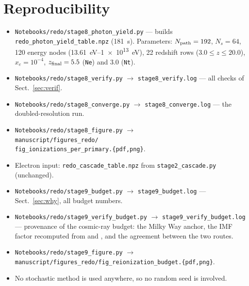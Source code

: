 \documentclass[11pt,a4paper]{article}
\begin{document}
\section*{Reproducibility}
\begin{itemize}\itemsep1pt
\item \texttt{Notebooks/redo/stage8\_photon\_yield.py} --- builds\\
      \texttt{redo\_photon\_yield\_table.npz} (\SI{181}{\second}).
      Parameters: $N_{\rm path}=192$, $N_s=64$, 120 energy nodes
      (\SIrange{13.61}{1e13}{\electronvolt}), 22 redshift rows
      ($3.0\le z\le20.0$), $x_e=10^{-4}$, $z_{\rm final}=5.5$
      (\texttt{Ne}) and $3.0$ (\texttt{Nt}).
\item \texttt{Notebooks/redo/stage8\_verify.py} $\to$
      \texttt{stage8\_verify.log} --- all checks of Sect.~\ref{sec:verif}.
\item \texttt{Notebooks/redo/stage8\_converge.py} $\to$
      \texttt{stage8\_converge.log} --- the doubled-resolution run.
\item \texttt{Notebooks/redo/stage8\_figure.py} $\to$\\
      \texttt{manuscript/figures\_redo/}\\
      \texttt{fig\_ionizations\_per\_primary.\{pdf,png\}}.
\item Electron input: \texttt{redo\_cascade\_table.npz} from
      \texttt{stage2\_cascade.py} (unchanged).
\item \texttt{Notebooks/redo/stage9\_budget.py} $\to$
      \texttt{stage9\_budget.log} --- Sect.~\ref{sec:why}, all budget numbers.
\item \texttt{Notebooks/redo/stage9\_verify\_budget.py} $\to$
      \texttt{stage9\_verify\_budget.log} --- provenance of the cosmic-ray
      budget: the Milky Way anchor, the IMF factor recomputed from
      \citet{chabrier03} and \citet{salpeter55}, and the agreement between
      the two routes.
\item \texttt{Notebooks/redo/stage9\_figure.py} $\to$\\
      \texttt{manuscript/figures\_redo/fig\_reionization\_budget.\{pdf,png\}}.
\item No stochastic method is used anywhere, so no random seed is involved.
\end{itemize}
\end{document}
